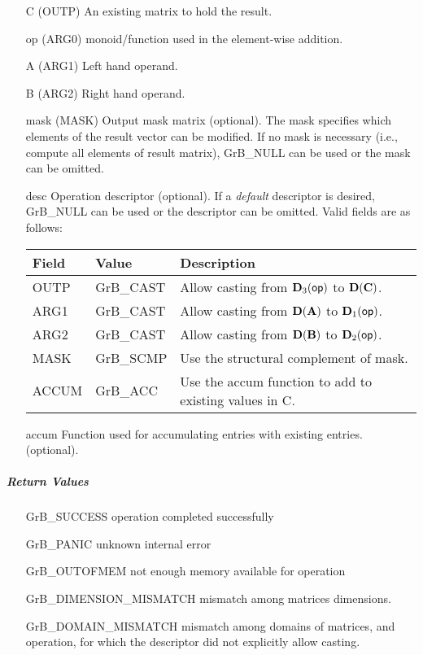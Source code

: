 \begin{itemize}[leftmargin=1.1in]
	\item[{\sf C}]     ({\sf OUTP}) An existing matrix to hold the result.
	\item[{\sf op}]    ({\sf ARG0}) monoid/function used in the element-wise addition.
	\item[{\sf A}]     ({\sf ARG1}) Left hand operand.
	\item[{\sf B}]     ({\sf ARG2}) Right hand operand.
	
	\item[{\sf mask}] ({\sf MASK}) Output mask matrix (optional). The mask
	specifies which elements of the result vector can be modified.
	If no mask is necessary (i.e., compute all elements of result
	matrix), {\sf GrB\_NULL} can be used or the mask can be omitted.
	
	\item[{\sf desc}]  Operation descriptor (optional). If a
	\emph{default} descriptor is desired, {\sf GrB\_NULL} can be
	used or the descriptor can be omitted. Valid fields are as follows: \\
	\begin{tabular}{lll}
		Field  & Value & Description \\
		\hline
		{\sf OUTP} & {\sf GrB\_CAST} & Allow casting from $\bold{D}_3({\sf op})$ to $\bold{D}({\bf C})$. \\
		{\sf ARG1} & {\sf GrB\_CAST} & Allow casting from $\bold{D}({\bf A})$ to $\bold{D}_1({\sf op})$. \\
		{\sf ARG2} & {\sf GrB\_CAST} & Allow casting from $\bold{D}({\bf B})$ to $\bold{D}_2({\sf op})$. \\
		{\sf MASK} & {\sf GrB\_SCMP} & Use the structural complement of {\sf mask}. \\
		{\sf ACCUM}& {\sf GrB\_ACC}  & Use the {\sf accum} function to add to existing values in {\sf C}.\\
	\end{tabular}
	
	\item[{\sf accum}]  Function used for accumulating entries with existing  entries. (optional).
\end{itemize}

\subparagraph{Return Values}

\begin{itemize}[leftmargin=2.1in]
	\item[{\sf GrB\_SUCCESS}]             operation completed successfully
	\item[{\sf GrB\_PANIC}]               unknown internal error
	\item[{\sf GrB\_OUTOFMEM}]            not enough memory available for operation
	\item[{\sf GrB\_DIMENSION\_MISMATCH}] mismatch among matrices dimensions.
	\item[{\sf GrB\_DOMAIN\_MISMATCH}]    mismatch among domains of matrices, and operation, for which the descriptor did not explicitly allow casting.
\end{itemize}

